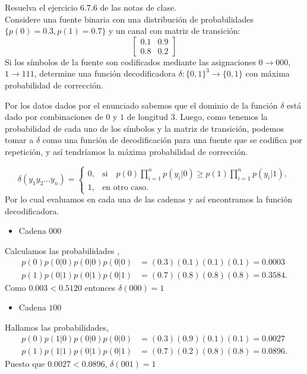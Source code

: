 
Resuelva el ejercicio $6\text{.}7\text{.}6$ de las notas de clase.\\
Considere una fuente binaria con una distribución de probabilidades $\{p(0) = 0\text{.}3, p(1) = 0\text{.}7\}$ y un canal con matriz de transición:
\begin{equation*}
    \begin{bmatrix} 0\text{.}1 & 0\text{.}9 \\ 0\text{.}8 & 0\text{.}2 \end{bmatrix}
\end{equation*}
Si los símbolos de la fuente son codificados mediante las asignaciones $0 \to 000$, $1 \to 111$, determine una función decodificadora $\delta: \{0,1\}^3 \to \{0,1\}$ con máxima probabilidad de corrección.
\begin{sol}

Por los datos dados por el enunciado sabemos que el dominio de la función $\delta$ está dado por combinaciones de $0$ y $1$ de longitud $3$. Luego, como tenemos la probabilidad de cada uno de los símbolos y la matriz de transición, podemos tomar a $\delta$ como una función de decodificación para una fuente que se codifica por repetición, y así tendríamos la máxima probabilidad de corrección.

$$
\delta(y_1 y_2 \dots y_n) =
\begin{cases}
0, & \text{si} \quad p(0) \prod_{i=1}^n p(y_i | 0) \geq p(1) \prod_{i=1}^n p(y_i | 1), \\
1, & \text{en otro caso}.
\end{cases}
$$
Por lo cual evaluamos en cada una de las cadenas y así encontramos la función decodificadora.
\begin{itemize}
    \item Cadena $000$
\end{itemize}
Calculamos las probabilidades ,
\begin{align*}
    p(0) p(0 | 0) p(0 | 0) p(0 | 0) &= (0.3)(0.1)(0.1)(0.1) = 0.0003\\
    p(1) p(0 | 1) p(0 | 1) p(0 | 1) &= (0.7)(0.8)(0.8)(0.8) = 0.3584
.\end{align*}
Como $0.003<0.5120$ entonces $\delta(000)=1$

\begin{itemize}
    \item Cadena $100$
\end{itemize}
Hallamos las probabilidades, 
\begin{align*}
    p(0) p(1 | 0) p(0 | 0) p(0 | 0) &= (0.3)(0.9)(0.1)(0.1) = 0.0027\\
    p(1) p(1 | 1) p(0 | 1) p(0 | 1) &= (0.7)(0.2)(0.8)(0.8) = 0.0896
.\end{align*}
Puesto que $0.0027<0.0896$, $\delta(001)=1$


\end{sol}
